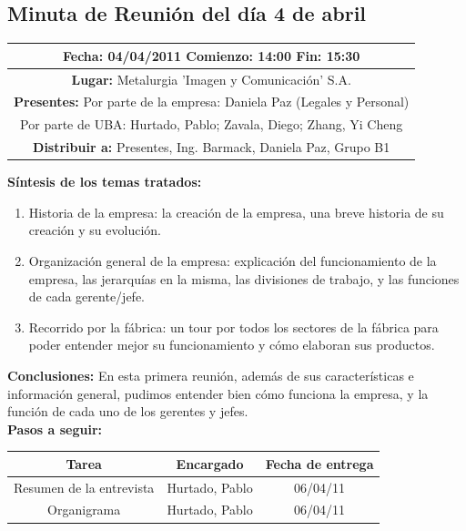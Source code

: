 \documentclass[a4paper,10pt,titlepage]{article}
\begin{document}
\newpage

\subsection{Minuta de Reuni\'on del d\'ia 4 de abril}

\begin{center}
\begin{tabular}{|c|}
	\hline
	\textbf{Fecha:} 04/04/2011    \textbf{Comienzo:} 14:00    \textbf{Fin:} 15:30 \\ \hline	

	\textbf{Lugar:} Metalurgia 'Imagen y Comunicaci\'on' S.A. \\
	\hline \textbf{Presentes:} Por parte de la empresa: Daniela Paz (Legales y Personal) \\
	Por parte de UBA: Hurtado, Pablo; Zavala, Diego; Zhang, Yi Cheng \\
	\hline \textbf{Distribuir a:} Presentes, Ing. Barmack, Daniela Paz, Grupo B1\\
	\hline
\end{tabular} 
\end{center}


\textbf{S\'intesis de los temas tratados:}

\begin{enumerate}
	\item Historia de la empresa: la creaci\'on de la empresa, una breve historia de su creaci\'on y su evoluci\'on.

	\item Organizaci\'on general de la empresa: explicaci\'on del funcionamiento de la empresa, las jerarqu\'ias en la misma, las divisiones de trabajo, y las funciones de cada gerente/jefe.

	\item Recorrido por la f\'abrica: un tour por todos los sectores de la f\'abrica para poder entender mejor su funcionamiento y c\'omo elaboran sus productos.
\end{enumerate}


\textbf{Conclusiones:} En esta primera reuni\'on, adem\'as de sus caracter\'isticas e informaci\'on general, pudimos entender bien c\'omo funciona la empresa, y la funci\'on de cada uno de los gerentes y jefes.\\


\textbf{Pasos a seguir:}\\

\begin{tabular}{|c|c|c|}
	\hline \textbf{Tarea} & \textbf{Encargado} & \textbf{Fecha de entrega} \\ 
	\hline Resumen de la entrevista & Hurtado, Pablo & 06/04/11 \\ 
	\hline Organigrama & Hurtado, Pablo & 06/04/11 \\ 
	\hline 
\end{tabular}\\\\
\end{document}
